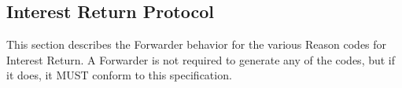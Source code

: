 \documentclass[12pt]{article}
\begin{document}
%

\subsection{Interest Return Protocol}
This section describes the Forwarder behavior for the various Reason
codes for Interest Return.  A Forwarder is not required to generate
any of the codes, but if it does, it MUST conform to this
specification.
\end{document}
